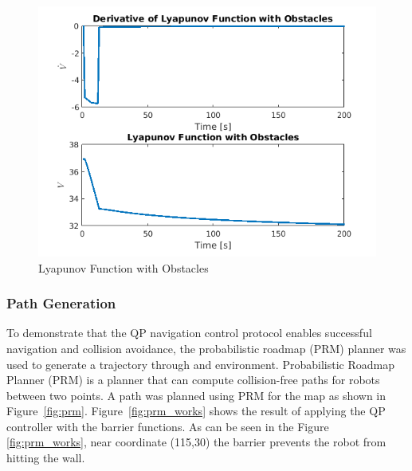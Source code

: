 \documentclass[journal]{IEEEconf}
\begin{document}
\begin{figure}[h!]
\centering
\includegraphics[scale=0.63]{v2.png} 
\caption{Lyapunov Function with Obstacles\label{fig:lyapunov}} 
\end{figure}
 \fi

\subsubsection{Path Generation}
To demonstrate that the QP navigation control protocol enables successful navigation and collision avoidance, the probabilistic roadmap (PRM) planner was used to generate a trajectory through and environment. Probabilistic Roadmap Planner (PRM) is a planner that can compute collision-free paths for robots between two points. A path was planned using PRM for the map as shown in Figure~\ref{fig:prm}.  Figure~\ref{fig:prm_works} shows the result of applying the QP controller with the barrier functions. As can be seen in the Figure \ref{fig:prm_works}, near coordinate (115,30) the barrier prevents the robot from hitting the wall. 
\end{document}
